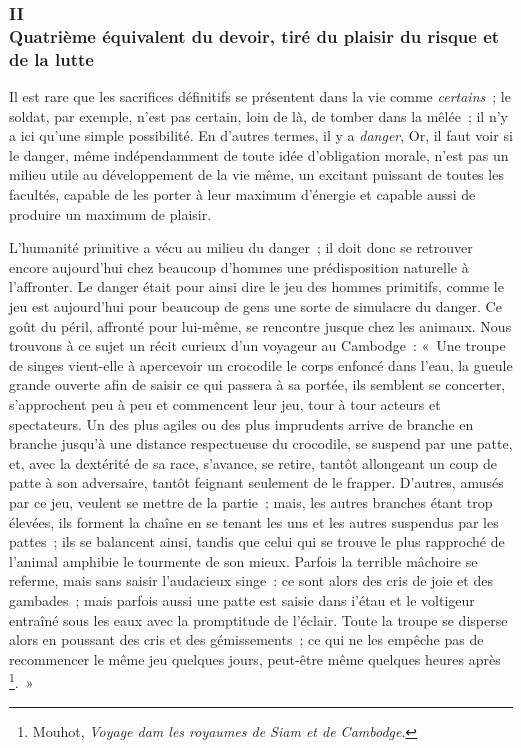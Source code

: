 \documentclass[french,twoside]{book} %
\begin{document}
\subsubsection[{II. Quatrième équivalent du devoir, tiré du plaisir du risque et de la lutte}]{II \\
Quatrième équivalent du devoir, tiré du plaisir du risque et de la lutte}
\noindent Il est rare que les sacrifices définitifs se présentent dans la vie comme \emph{certains} ; le soldat, par exemple, n’est pas certain, loin de là, de tomber dans la mêlée ; il n’y a ici qu’une simple possibilité. En d’autres termes, il y a \emph{danger}, Or, il faut voir si le danger, même indépendamment de toute idée d’obligation morale, n’est pas un milieu utile au développement de la vie même, un excitant puissant de toutes les facultés, capable de les porter à leur maximum d’énergie et capable aussi de produire un maximum de plaisir.\par
L’humanité primitive a vécu au milieu du danger ; il doit donc se retrouver encore aujourd’hui chez beaucoup d’hommes une prédisposition naturelle à l’affronter. Le danger était pour ainsi dire le jeu des hommes primitifs, comme le jeu est aujourd’hui pour beaucoup de gens une sorte de simulacre du danger. Ce goût du péril, affronté pour lui-même, se rencontre jusque chez les animaux. Nous trouvons à ce sujet un récit curieux d’un voyageur au Cambodge : « Une troupe de singes vient-elle à apercevoir un crocodile le corps enfoncé dans l’eau, la gueule grande ouverte afin de saisir ce qui passera à sa portée, ils semblent se concerter, s’approchent peu à peu et commencent leur jeu, tour à tour acteurs et spectateurs. Un des plus agiles ou des plus imprudents arrive de branche en branche jusqu’à une distance respectueuse du crocodile, se suspend par une patte, et, avec la dextérité de sa race, s’avance, se retire, tantôt allongeant un coup de patte à son adversaire, tantôt feignant seulement de le frapper. D’autres, amusés par ce jeu, veulent se mettre de la partie ; mais, les autres branches étant trop élevées, ils forment la chaîne en se tenant les uns et les autres suspendus par les pattes ; ils se balancent ainsi, tandis que celui qui se trouve le plus rapproché de l’animal amphibie le tourmente de son mieux. Parfois la terrible mâchoire se referme, mais sans saisir l’audacieux singe : ce sont alors des cris de joie et des gambades ; mais parfois aussi une patte est saisie dans i’étau et le voltigeur entraîné sous les eaux avec la promptitude de l’éclair. Toute la troupe se disperse alors en poussant des cris et des gémissements ; ce qui ne les empêche pas de recommencer le même jeu quelques jours, peut-être même quelques heures après \footnote{Mouhot, \emph{Voyage dam les royaumes de Siam et de Cambodge}.}. »\par
\end{document}
